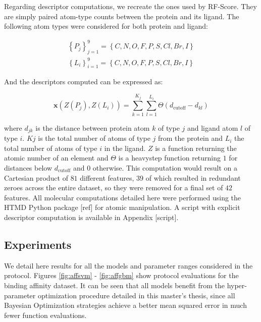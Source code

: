 \documentclass[10pt,a4paper,twoside]{book}
\begin{document}
Regarding descriptor computations, we recreate the ones used by RF-Score. They are simply paired atom-type counts between the protein and its ligand. The following atom types were considered for both protein and ligand:

\begin{align*}
\left\lbrace P_j \right\rbrace_{j=1}^9 = \left\lbrace C, N, O, F, P, S, Cl, Br, I \right\rbrace \\
\left\lbrace L_i \right\rbrace_{i=1}^9 = \left\lbrace C, N, O, F, P, S, Cl, Br, I \right\rbrace
\end{align*}

And the descriptors computed can be expressed as:

\begin{equation}
\boldsymbol{x}\left(Z(P_j), Z(L_i)\right) = \sum_{k=1}^{K_j}\sum_{l=1}^{L_i}\Theta (d_{\mathrm{cutoff}} - d_{kl})
\end{equation}

where $d_{jk}$ is the distance between protein atom $k$ of type $j$ and ligand atom $l$ of type $i$. $Kj$ is the total number of atoms of type $j$ from the protein and $L_i$ the total number of atoms of type $i$ in the ligand. $Z$ is a function returning the atomic number of an element and $\Theta$ is a heavystep function returning $1$ for distances below $d_{\mathrm{cutoff}}$ and $0$ otherwise. This computation would result on a Cartesian product of $81$ different features, $39$ of which resulted in redundant zeroes across the entire dataset, so they were removed for a final set of $42$ features. All molecular computations detailed here were performed using the HTMD Python package [ref] for atomic manipulation. A script with explicit descriptor computation is available in Appendix [script].

\subsection{Experiments}

We detail here results for all the models and parameter ranges considered in the protocol. Figures \ref{fig:affsvm} - \ref{fig:affgbm} show protocol evaluations for the binding affinity dataset. It can be seen that all models benefit from the hyper-parameter optimization procedure detailed in this master's thesis, since all Bayesian Optimization strategies achieve a better mean squared error in much fewer function evaluations.
\end{document}
